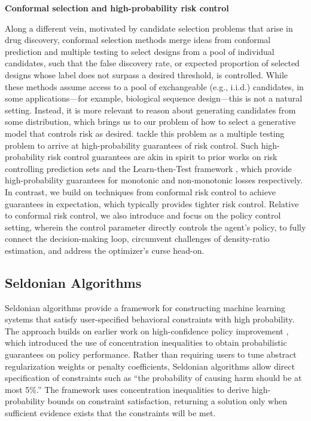 \textbf{Conformal selection and high-probability risk control}

Along a different vein, motivated by candidate selection problems that arise in drug discovery, conformal selection methods \cite{Jin2022, Jin2023-bw, Bai2024-bb, gui2025} merge ideas from conformal prediction and multiple testing to select designs from a pool of individual candidates, such that the false discovery rate, or expected proportion of selected designs whose label does not surpass a desired threshold, is controlled.
While these methods assume access to a pool of exchangeable (e.g., i.i.d.) candidates, in some applications---for example, biological sequence design---this is not a natural setting.
Instead, it is more relevant to reason about generating candidates from some distribution, which brings us to our problem of how to select a generative model that controls risk as desired.
\citet{fannjiang2025} tackle this problem as a multiple testing problem to arrive at high-probability guarantees of risk control. 
Such high-probability risk control guarantees are akin in spirit to prior works on risk controlling prediction sets \citep{bates2021distribution} and the Learn-then-Test framework \citep{angelopoulos2021learn}, which provide high-probability guarantees for monotonic and non-monotonic losses respectively. In contrast, we build on 
techniques from conformal risk control \cite{angelopoulos2022conformal} to achieve guarantees in expectation, which typically provides tighter risk control. Relative to conformal risk control, we also introduce and focus on the policy control setting, wherein the control parameter directly controls the agent's policy, to fully connect the decision-making loop, circumvent challenges of density-ratio estimation, and address the optimizer's curse head-on.


\subsection{Seldonian Algorithms}

Seldonian algorithms \citep{thomas2019preventing} provide a framework for constructing machine learning systems that satisfy user-specified behavioral constraints with high probability.
The approach builds on earlier work on high-confidence policy improvement \citep{thomas2015highconfidence}, which introduced the use of concentration inequalities to obtain probabilistic guarantees on policy performance.
Rather than requiring users to tune abstract regularization weights or penalty coefficients, Seldonian algorithms allow direct specification of constraints such as ``the probability of causing harm should be at most 5\%.''
The framework uses concentration inequalities to derive high-probability bounds on constraint satisfaction, returning a solution only when sufficient evidence exists that the constraints will be met.

